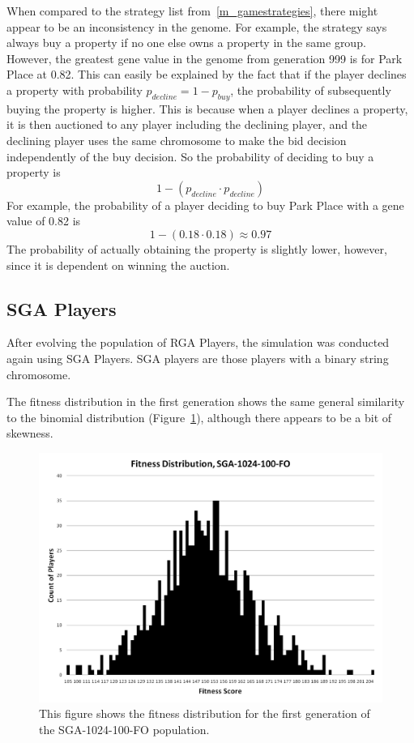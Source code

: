 When compared to the strategy list from~\ref{m_gamestrategies}, there might
appear to be an inconsistency in the genome. For example, the strategy says
always buy a property if no one else owns a property in the same group. However,
the greatest gene value in the genome from generation 999 is for Park Place at
0.82. This can easily be explained by the fact that if the player declines a
property with probability \(p_{decline} = 1-p_{buy}\), the probability of
subsequently buying the property is higher. This is because when a player
declines a property, it is then auctioned to any player including the declining
player, and the declining player uses the same chromosome to make the bid
decision independently of the buy decision. So the probability of deciding to
buy a property is
\begin{equation*}
1-(p_{decline} \cdot p_{decline})
\end{equation*}
For example, the probability of a player deciding to buy Park Place with a
gene value of 0.82 is
\begin{equation*}
1-(0.18 \cdot 0.18) \approx 0.97
\end{equation*}
The probability of actually obtaining the property is slightly lower, however,
since it is dependent on winning the auction.

\subsection{SGA Players} \label{6_SGA}

After evolving the population of RGA Players, the simulation was conducted again
using SGA Players. SGA players are those players with a binary string
chromosome.

The fitness distribution in the first generation shows the same general
similarity to the binomial distribution (Figure~\ref{figure-sga_gen0}), although
there appears to be a bit of skewness.

\begin{figure}[htp]
\centerline{\includegraphics[width=0.75\columnwidth]{Figures/SGA_1024_100_FO_gen0.png}}
\caption[SGA-1024-100-FO Fitness Generation 0]{This figure shows the fitness
distribution for the first generation of the SGA-1024-100-FO population.}
\label{figure-sga_gen0}
\end{figure}

